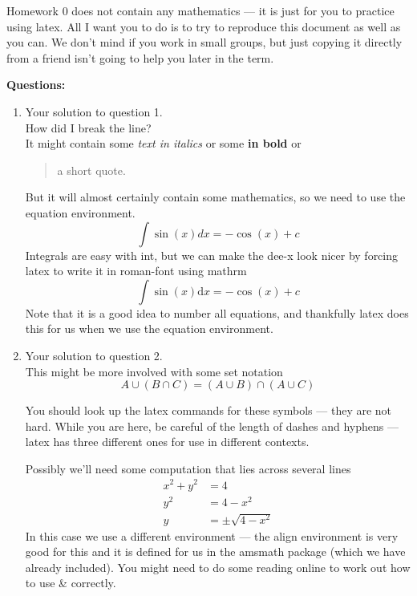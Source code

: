 \documentclass[letterpaper,12pt]{article}
\begin{document}
Homework 0 does not contain any mathematics --- it is just for you to practice using latex. All I want you to do is to try to reproduce this document as well as you can. We don't mind if you work in small groups, but just copying it directly from a friend isn't going to help you later in the term.


\textbf{Questions:}

\begin{enumerate}
  \item Your solution to question 1. \\
    How did I break the line? \\
    It might contain some \textit{text in italics} or some \textbf{in bold} or
    \begin{quote}a short quote.\end{quote}
    But it will almost certainly contain some mathematics, so we need to use the
    equation environment.
    \begin{equation}
      \int \sin (x) dx = - \cos (x) + c
    \end{equation}
    Integrals are easy with int, but we can make the dee-x look nicer by forcing
    latex to write it in roman-font using mathrm
    \begin{equation}
      \int \sin (x) \mathrm{d}x = - \cos (x) + c
    \end{equation}
    Note that it is a good idea to number all equations, and thankfully latex does
    this for us when we use the equation environment.


  \item Your solution to question 2. \\
    This might be more involved with some set notation \\
    \begin{equation}
      A \cup (B \cap C) = (A \cup B) \cap (A \cup C)
    \end{equation}

    You should look up the latex commands for these symbols --- they are not hard.
    While you are here, be careful of the length of dashes and hyphens --- latex
    has three different ones for use in different contexts.

    Possibly we’ll need some computation that lies across several lines
    \begin{align}
      x^{2} + y^{2} &= 4 \\
      y^2 &= 4 - x^2 \\
      y &= \pm \sqrt{4 - x^2}
    \end{align}
    In this case we use a different environment --- the align environment is very
    good for this and it is defined for us in the amsmath package (which we have
    already included). You might need to do some reading online to work out how
    to use \& correctly.


\end{enumerate}
\end{document}
